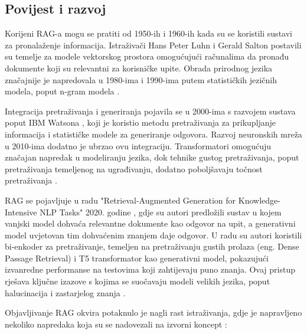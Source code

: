 \documentclass[]{foi}
\begin{document}
\subsection{Povijest i razvoj}
Korijeni RAG-a mogu se pratiti od 1950-ih i 1960-ih kada su se koristili sustavi za pronalaženje informacija. Istraživači Hans Peter Luhn i Gerald Salton postavili su temelje za modele
vektorskog prostora omogućujući računalima da pronađu dokumente koji su relevantni za korisničke upite. Obrada prirodnog jezika značajnije je napredovala u 1980-ima i 1990-ima putem
statističkih jezičnih modela, poput n-gram modela \cite{custom_ai_studio2025}. 

Integracija pretraživanja i generiranja pojavila se u 2000-ima s razvojem sustava poput IBM Watsona \cite{custom_ai_studio2025}, koji je koristio metodu pretraživanja za prikupljanje informacija i statističke modele 
za generiranje odgovora. Razvoj neuronskih mreža u 2010-ima dodatno je ubrzao ovu integraciju. Transformatori omogućuju značajan napredak u modeliranju jezika, dok tehnike gustog pretraživanja,
poput pretraživanja temeljenog na ugrađivanju, dodatno poboljšavaju točnost pretraživanja \cite{custom_ai_studio2025}. 

RAG se pojavljuje u radu "Retrieval-Augmented Generation for Knowledge-Intensive NLP Tasks" 2020. godine \cite{custom_ai_studio2025}, gdje su autori predložili sustav u kojem vanjski model dohvaća relevantne
dokumente kao odgovor na upit, a generativni model uvjetovan tim dohvaćenim znanjem daje odgovor. U radu su autori koristili bi-enkoder za pretraživanje, temeljen na pretraživanju gustih prolaza
(eng. Dense Passage Retrieval) i T5 transformator kao generativni model, pokazujući izvanredne performanse na testovima koji zahtijevaju puno znanja. 
Ovaj pristup rješava ključne izazove s kojima se suočavaju modeli velikih jezika, poput halucinacija i zastarjelog znanja \cite{custom_ai_studio2025}. 

Objavljivanje RAG okvira potaknulo je nagli rast istraživanja, gdje je napravljeno nekoliko napredaka koja su se nadovezali na izvorni koncept \cite{custom_ai_studio2025}:
\end{document}
